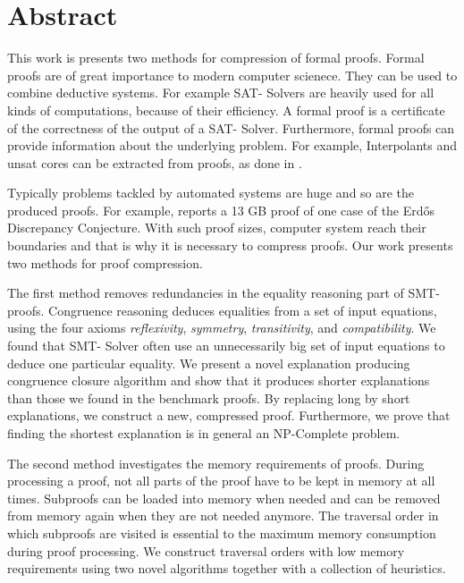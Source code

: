 \chapter*{Abstract}

This work is presents two methods for compression of formal proofs.
Formal proofs are of great importance to modern computer scienece.
They can be used to combine deductive systems.
For example SAT- Solvers \cite{Biere2009} are heavily used for all kinds of computations, because of their efficiency.
A formal proof is a certificate of the correctness of the output of a SAT- Solver.
Furthermore, formal proofs can provide information about the underlying problem.
For example, Interpolants \cite{McMill2005} and unsat cores can be extracted from proofs, as done in \cite{Hofferek2013}.

Typically problems tackled by automated systems are huge and so are the produced proofs.
For example, \cite{Konev2014} reports a 13 GB proof of one case of the Erd\H{o}s Discrepancy Conjecture.
With such proof sizes, computer system reach their boundaries and that is why it is necessary to compress proofs.
Our work presents two methods for proof compression.

The first method removes redundancies in the equality reasoning part of SMT- proofs.
Congruence reasoning deduces equalities from a set of input equations, using the four axioms \emph{reflexivity}, \emph{symmetry}, \emph{transitivity}, and \emph{compatibility}.
We found that SMT- Solver often use an unnecessarily big set of input equations to deduce one particular equality.
We present a novel explanation producing congruence closure algorithm and show that it produces shorter explanations than those we found in the benchmark proofs.
By replacing long by short explanations, we construct a new, compressed proof.
Furthermore, we prove that finding the shortest explanation is in general an NP-Complete problem.

The second method investigates the memory requirements of proofs.
During processing a proof, not all parts of the proof have to be kept in memory at all times.
Subproofs can be loaded into memory when needed and can be removed from memory again when they are not needed anymore.
The traversal order in which subproofs are visited is essential to the maximum memory consumption during proof processing.
We construct traversal orders with low memory requirements using two novel algorithms together with a collection of heuristics. 

